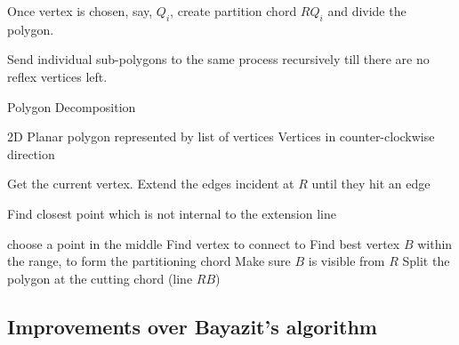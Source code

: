 \begin{list}{}{}

\item 
Once vertex is chosen, say, $Q_i$, create partition chord $RQ_i$ and divide the  polygon.%




\item 
Send individual sub-polygons to the same process recursively till there are no reflex vertices left. 

\end{list}



\begin{algorithm}
	\caption{Polygon Decomposition}
	\label{alg1}
	\begin{algorithmic}
		\REQUIRE 2D Planar polygon represented by list of vertices
		\ENSURE Vertices in counter-clockwise direction

			\STATE Get the current vertex.
				\STATE Extend  the  edges incident at $R$ until they hit an edge

					\STATE Find closest point which is not internal to the extension line
				\ENDIF

					\STATE choose a point in the middle
				\ELSE
					\STATE Find vertex to connect to
					\STATE Find best vertex $B$ within the range, to form the partitioning chord
					\STATE Make sure $B$ is visible from $R$
				\ENDIF
			\ENDIF
		\ENDWHILE
		\STATE  Split the polygon at the cutting chord (line $RB$)
	\end{algorithmic}
\end{algorithm}

\subsection{Improvements over Bayazit's algorithm}

